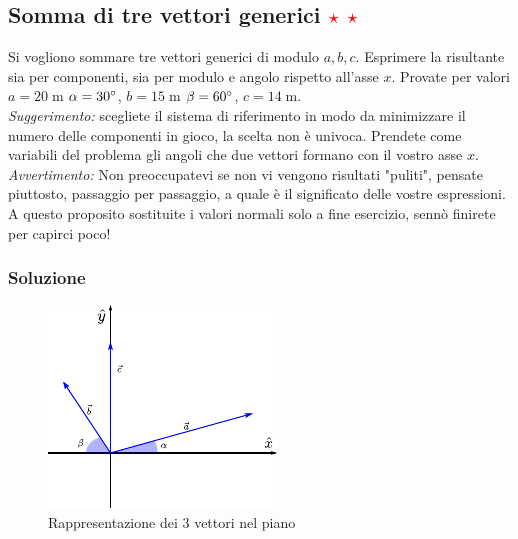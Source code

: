 \documentclass[12pt,a4paper]{book}
\newcommand{\rstar}{ \textcolor{red}{$\star$}}
\begin{document}
\subsection{Somma di tre vettori generici \rstar\rstar}
Si vogliono sommare tre vettori generici di modulo $a, b, c$. Esprimere la risultante sia per componenti, sia per modulo e angolo rispetto all'asse $x$. Provate per valori $a=20\;\text{m}$ $\alpha=30\degree$, $b=15\;\text{m}$ $\beta=60\degree$, $c=14\;\text{m}$. \\
\textit{Suggerimento:} scegliete il sistema di riferimento in modo da minimizzare il numero delle componenti in gioco, la scelta non è univoca. Prendete come variabili del problema gli angoli che due vettori formano con il vostro asse $x$.  \\
\textit{Avvertimento:} Non preoccupatevi se non vi vengono risultati "puliti", pensate piuttosto, passaggio per passaggio, a quale è il significato delle vostre espressioni. A questo proposito sostituite i valori normali solo a fine esercizio, sennò finirete per capirci poco!
\subsubsection*{Soluzione}

\begin{figure}[h]
 \centering
\includegraphics[scale=2.0]{vec_sum.pdf}
 \caption{Rappresentazione dei 3 vettori nel piano}
 \label{fig:vec_sum}
\end{figure}
\end{document}
